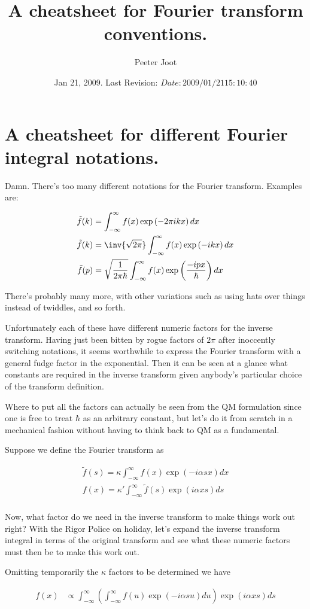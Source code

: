 \documentclass{article}
\title{ A cheatsheet for Fourier transform conventions. }
\author{Peeter Joot}
\date{ Jan 21, 2009.  Last Revision: $Date: 2009/01/21 15:10:40 $ }
\newcommand{\IIinf}[0]{ \int_{-\infty}^\infty }
\begin{document}
\maketitle{}


%
%
\section{ A cheatsheet for different Fourier integral notations. }

Damn.  There's too many different notations for the Fourier transform.  Examples are:

\begin{align*}
\tilde{f}(k) &= \IIinf f(x) \exp\left( - 2 \pi i k x \right) dx \\
\tilde{f}(k) &= \inv{\sqrt{2\pi}} \IIinf f(x) \exp\left( -i k x \right) dx \\
\tilde{f}(p) &= \sqrt{\frac{1}{2\pi\hbar}} \IIinf f(x) \exp\left( \frac{-i p x}{\hbar} \right) dx \\
\end{align*}

There's probably many more, with other variations such as using hats over things instead of twiddles, and so forth.

Unfortunately each of these have different numeric factors for the inverse transform.
Having just been bitten by rogue factors of $2 \pi$ after inoccently switching notations, it seems
worthwhile
to express the Fourier transform with a general fudge factor in the exponential.  Then it can be
seen at a 
glance what constants are required in the inverse transform given anybody's particular choice of the transform
definition.

Where to put all the factors can actually be seen from the QM formulation since one is free to treat $\hbar$
as an arbitrary constant, but let's do it from scratch in a mechanical fashion without having to think
back to QM as a fundamental.

Suppose we define the Fourier transform as 

\begin{align*}
\tilde{f}(s) = \kappa \IIinf f(x) \exp\left( - i \alpha s x \right) dx \\
{f}(x) = \kappa' \IIinf \tilde{f}(s) \exp\left( i \alpha x s \right) ds \\
\end{align*}

Now, what factor do we need in the inverse transform to make things work out right?  With the Rigor
Police on holiday, let's expand the inverse transform integral in terms of the original transform
and see what these numeric factors must then be to make this work out.

Omitting temporarily the $\kappa$ factors to be determined we have 

\begin{align*}
f(x) 
&\propto \IIinf \left( \IIinf f(u) \exp\left( - i \alpha s u \right) du \right) \exp\left( i \alpha x s \right) ds \\
\end{align*}
\end{document}
